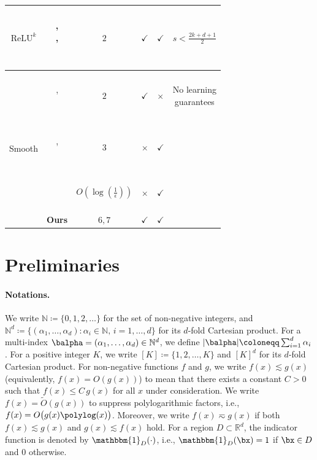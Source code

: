 \documentclass[11pt]{article}
\begin{document}
\begin{table}[!t]
{\begin{tabular}{|c|c|c|c|c|c|}
    \hline
    {$\mathrm{ReLU}^k$} & \makecell[c]{~\\[-9pt]\citet{petrushev1998approximation}, \\[1pt] \citet{pinkus1999approximation}, \\[1pt] \citet{yang2025optimal}\\[-10pt]~} & $2$ & $\checkmark$ & $\checkmark$ & $s < \frac{2k+d+1}{2}$ \\
    \hline 
    \multirow{4}{*}{Smooth} & \makecell[c]{~\\[-9pt]\citet{mhaskar1996neural}, \\[1pt] \citet{pinkus1999approximation}\\[-10pt]~} & $2$ & $\checkmark$ & $\times$ & \makecell[c]{No learning\\ guarantees}\\
    \cline{2-6}
    & \makecell[c]{~\\[-9pt]\citet{de2021approximation}, \\[1pt] \citet{bauer2019deep}\\[-10pt]~} & $3$ & $\times$ & $\checkmark$ & \\
    \cline{2-6}
    & \makecell[c]{~\\[-9pt] \citet{ohn2019smooth}\\[-10pt]~} & $O(\log(\frac{1}{\epsilon}))$ & $\times$  & $\checkmark$ &  \\
    \cline{2-6}
    & \textbf{Ours} & $6,7$ & $\checkmark$  & $\checkmark$ & \\
    \hline
    \end{tabular}
    }
\label{tab:compare-results}
\end{table}


\section{Preliminaries}
\label{sec:preliminary}

\paragraph*{Notations.}

We write $\mathbb{N} \coloneqq \{0,1,2,\dots\}$ for the set of non-negative integers, and
$\mathbb{N}^d \coloneqq \{(\alpha_1,\dots,\alpha_d) : \alpha_i\in\mathbb{N},\, i=1,\dots,d\}$
for its $d$-fold Cartesian product. For a multi-index $\balpha=(\alpha_1,\dots,\alpha_d)\in\mathbb{N}^d$,
we define $|\balpha|\coloneqq \sum_{i=1}^d \alpha_i$.
For a positive integer $K$, we write $[K]\coloneqq\{1,2,\dots,K\}$ and $[K]^d$ for its $d$-fold Cartesian product.
For non-negative functions $f$ and $g$, we write $f(x)\lesssim g(x)$ (equivalently, $f(x)=O(g(x))$)
to mean that there exists a constant $C>0$ such that $f(x)\le C\,g(x)$ for all $x$ under consideration.
We write $f(x)=\tilde{O}(g(x))$ to suppress polylogarithmic factors, i.e.,
$f(x)=O\bigl(g(x)\polylog(x)\bigr)$.
Moreover, we write $f(x)\eqsim g(x)$ if both $f(x)\lesssim g(x)$ and $g(x)\lesssim f(x)$ hold.
For a region $D\subset\mathbb{R}^d$, the indicator function is denoted by $\mathbbm{1}_{D}(\cdot)$,
i.e., $\mathbbm{1}_{D}(\bx)=1$ if $\bx\in D$ and $0$ otherwise.
\end{document}
